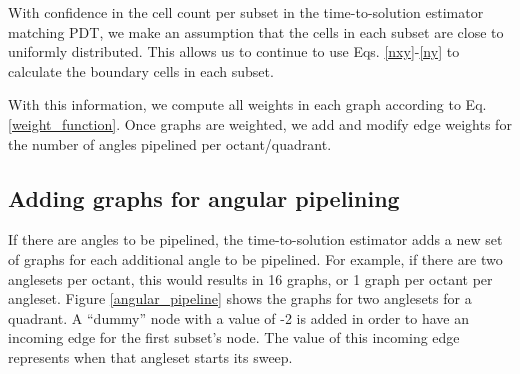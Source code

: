 With confidence in the cell count per subset in the time-to-solution estimator matching PDT, we make an assumption that the cells in each subset are close to uniformly distributed. This allows us to continue to use Eqs. \ref{nxy}-\ref{ny} to calculate the boundary cells in each subset.

With this information, we compute all weights in each graph according to Eq. \ref{weight_function}.
Once graphs are weighted, we add and modify edge weights for the number of angles pipelined per octant/quadrant.

\subsection{Adding graphs for angular pipelining}

If there are angles to be pipelined, the time-to-solution estimator adds a new set of graphs for each additional angle to be pipelined. For example, if there are two anglesets per octant, this would results in 16 graphs, or 1 graph per octant per angleset. Figure \ref{angular_pipeline} shows the graphs for two anglesets for a quadrant. A ``dummy'' node with a value of -2 is added in order to have an incoming edge for the first subset's node. The value of this incoming edge represents when that angleset starts its sweep.
